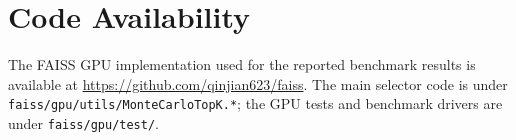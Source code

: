 \section*{Code Availability}

The FAISS GPU implementation used for the reported benchmark results is
available at \url{https://github.com/qinjian623/faiss}. The main selector code
is under \texttt{faiss/gpu/utils/MonteCarloTopK.*}; the GPU tests and benchmark
drivers are under \texttt{faiss/gpu/test/}.
